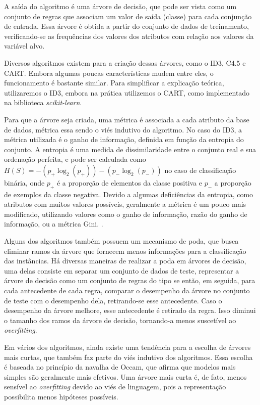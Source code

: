 \documentclass{article}
\begin{document}
A saída do algoritmo é uma árvore de decisão,
que pode ser vista como um conjunto de regras que associam um valor de saída (classe) para cada conjunção de entrada.
Essa árvore é obtida a partir do conjunto de dados de treinamento,
verificando-se as frequências dos valores dos atributos com relação aos valores da variável alvo.

Diversos algoritmos existem para a criação dessas árvores, como o ID3, C4.5 e CART.
Embora algumas poucas características mudem entre eles, o funcionamento é bastante similar.
Para simplificar a explicação teórica, utilizaremos o ID3,
embora na prática utilizemos o CART, como implementado na biblioteca {\it scikit-learn}.

Para que a árvore seja criada, uma métrica é associada a cada atributo da base de dados,
métrica essa sendo o viés indutivo do algoritmo.
No caso do ID3, a métrica utilizada é o ganho de informação, definida em função da entropia do conjunto.
A entropia é uma medida de dissimilaridade entre o conjunto real e sua ordenação perfeita,
e pode ser calculada como $H(S) = -(p_+ \log_2(p_+)) - (p_- \log_2(p_-))$ no caso de classificação binária,
onde $p_+$ é a proporção de elementos da classe positiva e $p_-$ a proporção de exemplos da classe negativa.
Devido a algumas deficiências da entropia, como atributos com muitos valores possíveis,
geralmente a métrica é um pouco mais modificado, utilizando valores como o ganho de informação,
razão do ganho de informação, ou a métrica Gini.
\cite{classification-and-regression-trees}.

Alguns dos algoritmos também possuem um mecanismo de poda, que busca eliminar ramos da árvore que fornecem menos informações para a classificação das instâncias.
Há diversas maneiras de realizar a poda em árvores de decisão,
uma delas consiste em separar um conjunto de dados de teste,
representar a árvore de decisão como um conjunto de regras do tipo se então,
em seguida, para cada antecedente de cada regra, comparar o desempenho da árvore no conjunto de teste com o desempenho dela,
retirando-se esse antecedente. Caso o desempenho da árvore melhore, esse antecedente é retirado da regra.
Isso diminui o tamanho dos ramos da árvore de decisão, tornando-a menos suscetível ao {\it overfitting}.

Em vários dos algoritmos, ainda existe uma tendência para a escolha de árvores mais curtas,
que também faz parte do viés indutivo dos algoritmos.
Essa escolha é baseada no princípio da navalha de Occam,
que afirma que modelos mais simples são geralmente mais efetivos.
Uma árvore mais curta é, de fato, menos sensível ao {\it overfitting}
devido ao viés de linguagem, pois a representação possibilita menos hipóteses possíveis.
\end{document}
